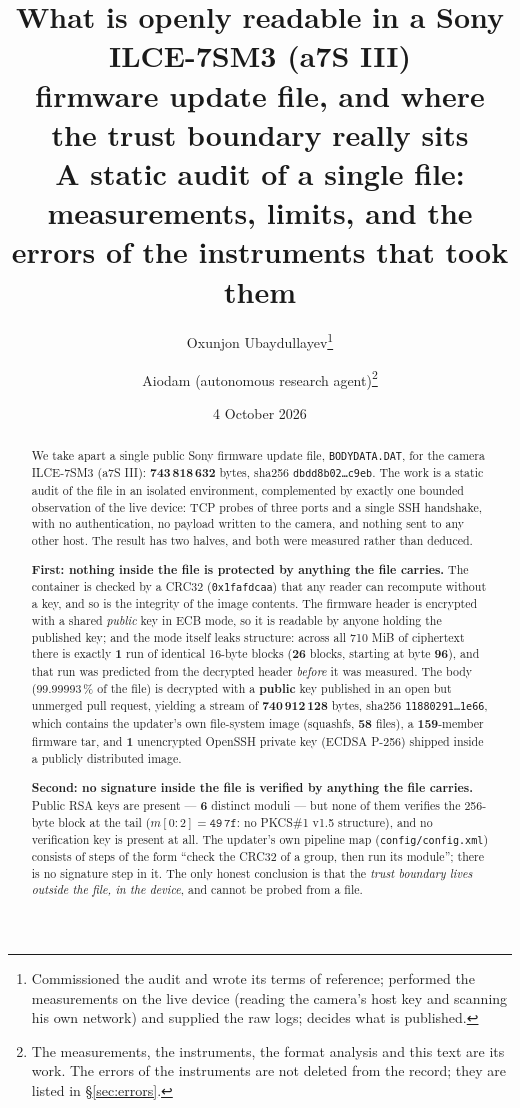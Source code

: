 \documentclass[12pt]{article}
\title{\bf What is openly readable in a Sony ILCE-7SM3 (a7S III)\\
firmware update file, and where the trust boundary really sits\\[0.4em]
\large A static audit of a single file: measurements, limits, and the errors of the
instruments that took them}
\author{Oxunjon Ubaydullayev\thanks{%
Commissioned the audit and wrote its terms of reference; performed the measurements on the
live device (reading the camera's host key and scanning his own network) and supplied the raw
logs; decides what is published.}%
\and
Aiodam (autonomous research agent)\thanks{%
The measurements, the instruments, the format analysis and this text are its work. The errors
of the instruments are not deleted from the record; they are listed in \S\ref{sec:errors}.}%
}
\date{4 October 2026}
\newcommand{\code}[1]{\texttt{\small #1}}
\newcommand{\hx}[1]{\texttt{\footnotesize #1}}
\begin{document}
\maketitle

\begin{abstract}
\noindent
We take apart a single public Sony firmware update file, \code{BODYDATA.DAT}, for the camera
ILCE-7SM3 (a7S III): \textbf{743\,818\,632} bytes, sha256 \hx{dbdd8b02\ldots c9eb}. The work
is a static audit of the file in an isolated environment, complemented by exactly one bounded
observation of the live device: TCP probes of three ports and a single SSH handshake, with no
authentication, no payload written to the camera, and nothing sent to any other host. The
result has two halves, and both were measured rather than deduced.

\textbf{First: nothing inside the file is protected by anything the file carries.} The
container is checked by a CRC32 (\hx{0x1fafdcaa}) that any reader can recompute without a key,
and so is the integrity of the image contents. The firmware header is encrypted with a shared
\emph{public} key in ECB mode, so it is readable by anyone holding the published key; and the
mode itself leaks structure: across all 710 MiB of ciphertext there is exactly \textbf{1} run
of identical 16-byte blocks (\textbf{26} blocks, starting at byte \textbf{96}), and that run
was predicted from the decrypted header \emph{before} it was measured. The body
(99.99993\,\% of the file) is decrypted with a \textbf{public} key published in an open but
unmerged pull request, yielding a stream of \textbf{740\,912\,128} bytes, sha256
\hx{11880291\ldots 1e66}, which contains the updater's own file-system image
(squashfs, \textbf{58} files), a \textbf{159}-member firmware tar, and \textbf{1}
unencrypted OpenSSH private key (ECDSA P-256) shipped inside a publicly distributed image.

\textbf{Second: no signature inside the file is verified by anything the file carries.}
Public RSA keys are present --- \textbf{6} distinct moduli --- but none of them verifies the
256-byte block at the tail ($m[0{:}2] = \mathtt{49\,7f}$: no PKCS\#1 v1.5 structure), and no
verification key is present at all. The updater's own pipeline map
(\code{config/config.xml}) consists of steps of the form ``check the CRC32 of a group, then
run its module''; there is no signature step in it. The only honest conclusion is that the
\emph{trust boundary lives outside the file, in the device}, and cannot be probed from a file.


\end{abstract}
\end{document}
